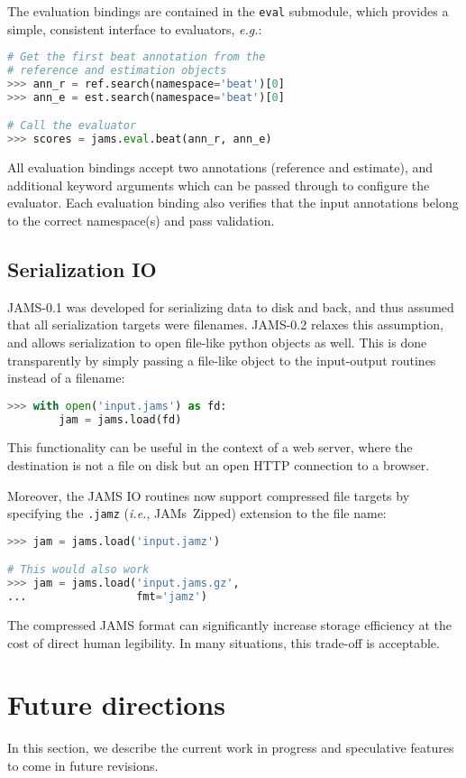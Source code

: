 \documentclass{article}
\begin{document}
The evaluation bindings are contained in the \texttt{eval} submodule, which provides
a simple, consistent interface to evaluators, \emph{e.g.}:
\begin{lstlisting}[language=python]
# Get the first beat annotation from the
# reference and estimation objects
>>> ann_r = ref.search(namespace='beat')[0]
>>> ann_e = est.search(namespace='beat')[0]

# Call the evaluator
>>> scores = jams.eval.beat(ann_r, ann_e)
\end{lstlisting}
All evaluation bindings accept two annotations (reference and estimate), and additional
keyword arguments which can be passed through to configure the evaluator.
Each evaluation binding also verifies that the input annotations belong to the 
correct namespace(s) and pass validation.


\subsection{Serialization IO}\label{sec:imp:compression}

JAMS-0.1 was developed for serializing data to disk and back, and thus assumed that all
serialization targets were filenames.  JAMS-0.2 relaxes this assumption, and allows
serialization to open file-like python objects as well.  This is done transparently by
simply passing a file-like object to the input-output routines instead of a filename:
\begin{lstlisting}[language=python]
>>> with open('input.jams') as fd:
        jam = jams.load(fd)
\end{lstlisting}
This functionality can be useful in the context of a web server, where 
the destination is not a file on disk but an open HTTP connection to a browser.

Moreover, the JAMS IO routines now support compressed file targets by specifying the
\texttt{.jamz} (\emph{i.e.}, JAMs~Zipped) extension to the file name:
\begin{lstlisting}[language=python]
>>> jam = jams.load('input.jamz')

# This would also work
>>> jam = jams.load('input.jams.gz',
...                 fmt='jamz')
\end{lstlisting}
The compressed JAMS format can significantly increase storage efficiency at the cost of
direct human legibility.  In many situations, this trade-off is acceptable.

\section{Future directions}\label{sec:future}
In this section, we describe the current work in progress and speculative features to
come in future revisions.
\end{document}
